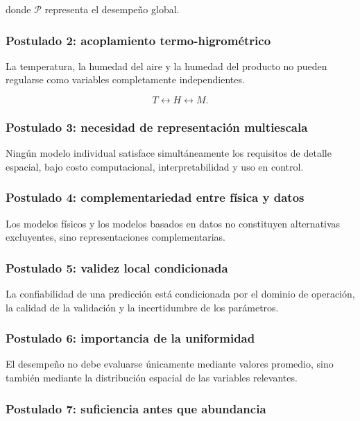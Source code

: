 donde $\mathcal{P}$ representa el desempeño global.

\subsubsection*{Postulado 2: acoplamiento termo-higrométrico}

La temperatura, la humedad del aire y la humedad del producto no pueden regularse como variables completamente independientes.

\begin{equation}
T
\leftrightarrow
H
\leftrightarrow
M.
\end{equation}

\subsubsection*{Postulado 3: necesidad de representación multiescala}

Ningún modelo individual satisface simultáneamente los requisitos de detalle espacial, bajo costo computacional, interpretabilidad y uso en control.

\subsubsection*{Postulado 4: complementariedad entre física y datos}

Los modelos físicos y los modelos basados en datos no constituyen alternativas excluyentes, sino representaciones complementarias.

\subsubsection*{Postulado 5: validez local condicionada}

La confiabilidad de una predicción está condicionada por el dominio de operación, la calidad de la validación y la incertidumbre de los parámetros.

\subsubsection*{Postulado 6: importancia de la uniformidad}

El desempeño no debe evaluarse únicamente mediante valores promedio, sino también mediante la distribución espacial de las variables relevantes.

\subsubsection*{Postulado 7: suficiencia antes que abundancia}

